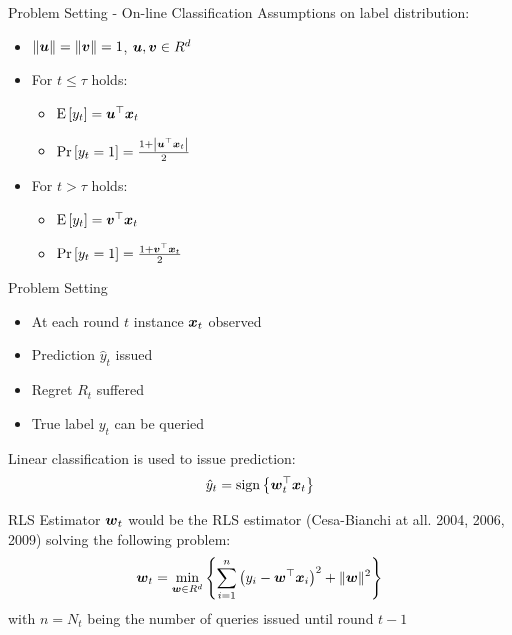 \documentclass{beamer}
\begin{document}
\begin{frame}{Problem Setting - On-line Classification}
Assumptions on label distribution:\newline
\begin{itemize}
\item $\|{\boldsymbol{u}}\|=\|{\boldsymbol{v}}\|=1$, ${\boldsymbol{u}},{\boldsymbol{v}}\in R^d$ \newline
\item For $t\leq\tau$ holds:\newline
\begin{itemize}
\item  ${\rm E}\left[{y_t}\right]={{\boldsymbol{u}}}^{\top}{\boldsymbol{x}}_{t}$\newline
\item  ${\rm Pr}\left[{y_t=1}\right]=\frac{1+\left|{{\boldsymbol{u}}}^{\top}{\boldsymbol{x}}_{t}\right|}{2}$\newline
\end{itemize}
\item For $t>\tau$ holds:\newline
\begin{itemize}
\item ${\rm E}\left[{y_t}\right]={{\boldsymbol{v}}}^{\top}{\boldsymbol{x}}_{t}$\newline
\item ${\rm Pr}\left[{y_t=1}\right]=\frac{1+{{\boldsymbol{v}}}^{\top}{\boldsymbol{x}}_{t}}{2}$\newline
\end{itemize}
\end{itemize}
\end{frame}



\begin{frame}{Problem Setting}
\begin{itemize}
\item At each round $t$ instance ${\boldsymbol{x}}_{t}$ observed\newline
\item Prediction $\hat{y}_t$ issued\newline
\item Regret $R_t$ suffered\newline
\item True label $y_t$ can be queried \newline
\end{itemize}
Linear classification is used to issue prediction:
\begin{equation}
\hat{y}_t={\rm sign}\left\{{{\boldsymbol{w}}}^{\top}_{t}{\boldsymbol{x}}_{t}\right\}
\end{equation}
\end{frame}

\begin{frame}{RLS Estimator}
${\boldsymbol{w}}_{t}$ would be the RLS estimator (Cesa-Bianchi at all. 2004, 2006, 2009) solving the following problem:\newline\newline
\begin{equation*}
{\boldsymbol{w}}_{t}=\min_{{\boldsymbol{w}}\in R^d}{\left\{\sum\limits_{i=1}^{n}\left(y_i-{{\boldsymbol{w}}}^{\top}{\boldsymbol{x}}_{i}\right)^2+\|{\boldsymbol{w}}\|^2\right\}}
\label{RLS_prob}
\end{equation*}\newline\newline
with $n=N_t$ being the number of queries issued until round $t-1$
\end{frame}
\end{document}
